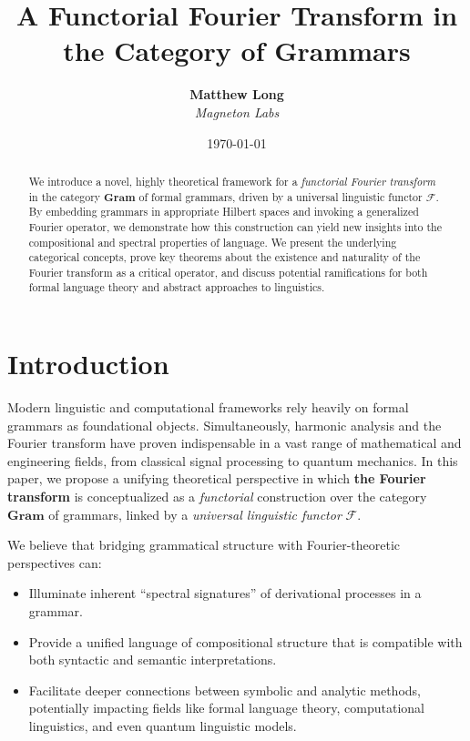 \documentclass[11pt]{article}
\title{\textbf{A Functorial Fourier Transform in the Category of Grammars}}
\author{
  \textbf{Matthew Long}\\
  \textit{Magneton Labs}
}
\date{\today}
\begin{document}
\maketitle

\begin{abstract}
We introduce a novel, highly theoretical framework for a \emph{functorial Fourier transform} in the category \(\mathbf{Gram}\) of formal grammars, driven by a universal linguistic functor \(\mathcal{F}\). By embedding grammars in appropriate Hilbert spaces and invoking a generalized Fourier operator, we demonstrate how this construction can yield new insights into the compositional and spectral properties of language. We present the underlying categorical concepts, prove key theorems about the existence and naturality of the Fourier transform as a critical operator, and discuss potential ramifications for both formal language theory and abstract approaches to linguistics.
\end{abstract}

\tableofcontents

\section{Introduction}

Modern linguistic and computational frameworks rely heavily on formal grammars as foundational objects. Simultaneously, harmonic analysis and the Fourier transform have proven indispensable in a vast range of mathematical and engineering fields, from classical signal processing to quantum mechanics. In this paper, we propose a unifying theoretical perspective in which \textbf{the Fourier transform} is conceptualized as a \emph{functorial} construction over the category \(\mathbf{Gram}\) of grammars, linked by a \emph{universal linguistic functor} \(\mathcal{F}\). 

We believe that bridging grammatical structure with Fourier-theoretic perspectives can:
\begin{itemize}
    \item Illuminate inherent ``spectral signatures'' of derivational processes in a grammar.
    \item Provide a unified language of compositional structure that is compatible with both syntactic and semantic interpretations.
    \item Facilitate deeper connections between symbolic and analytic methods, potentially impacting fields like formal language theory, computational linguistics, and even quantum linguistic models.
\end{itemize}
\end{document}
